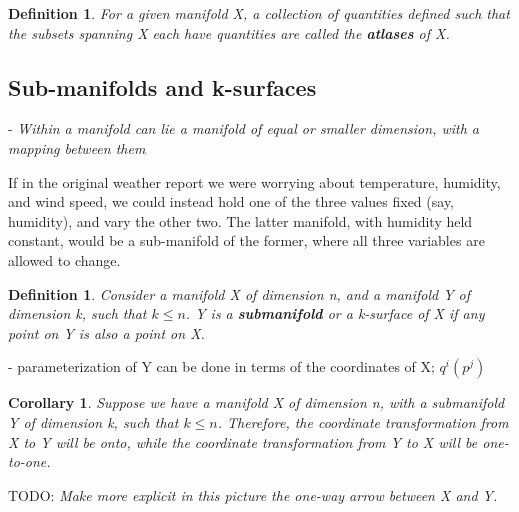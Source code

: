 \documentclass{book}
\newtheorem{defn}[equation]{Definition}
\newtheorem{coro}[equation]{Corollary}
\begin{document}
\begin{defn}
	For a given manifold X, a collection of quantities defined such that the subsets spanning X each have quantities are called the \textbf{atlases} of X. 
\end{defn}



\subsection{Sub-manifolds and k-surfaces}

- \emph{Within a manifold can lie a manifold of equal or smaller dimension, with a mapping between them}

If in the original weather report we were worrying about temperature, humidity, and wind speed, we could instead hold one of the three values fixed (say, humidity), and vary the other two. The latter manifold, with humidity held constant, would be a sub-manifold of the former, where all three variables are allowed to change.  



\begin{defn}
	Consider a manifold X of dimension n, and a manifold Y of dimension k, such that $k \leq n$. Y is a \textbf{submanifold} or a k-surface of X if any point on Y is also a point on X. 
\end{defn}

- parameterization of Y can be done in terms of the coordinates of X; $q^i(p^j)$



\begin{coro}
	Suppose we have a manifold X of dimension n, with a submanifold Y of dimension k, such that $k \leq n$. Therefore, the coordinate transformation from X to Y will be onto, while the coordinate transformation from Y to X will be one-to-one. 
\end{coro}


TODO: \emph{Make more explicit in this picture the one-way arrow between X and Y.}

\end{document}
